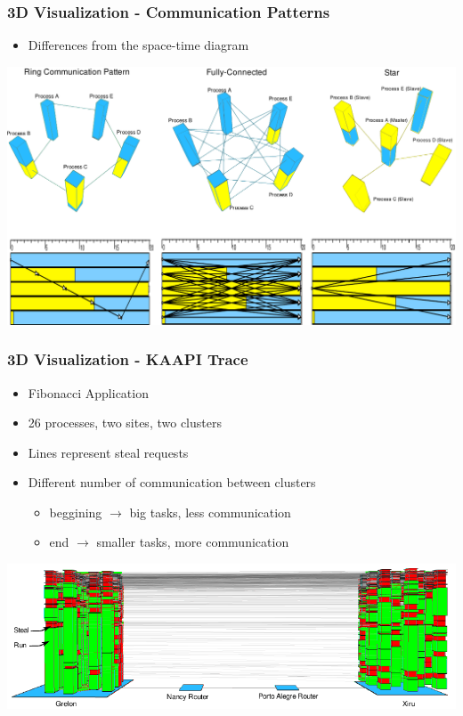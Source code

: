 
%


\frame
{
   \frametitle{3D Visualization - Communication Patterns}

   \begin{itemize}
   \item Differences from the space-time diagram
   \end{itemize}

   \vfill
   \includegraphics[width=\textwidth]{img/apppattern-ring-full-star.pdf}
   \vfill
}


\frame
{
   \frametitle{3D Visualization - KAAPI Trace}
   \begin{itemize}
   \item Fibonacci Application
   \item 26 processes, two sites, two clusters
   \item Lines represent steal requests
   \item Different number of communication between clusters
      \begin{itemize}
      \item beggining $\rightarrow$ big tasks, less communication
      \item end $\rightarrow$ smaller tasks, more communication
      \end{itemize}
   \end{itemize}

   \vfill
   \includegraphics[width=\textwidth]{img/scenario-3d-A2.pdf}
}


